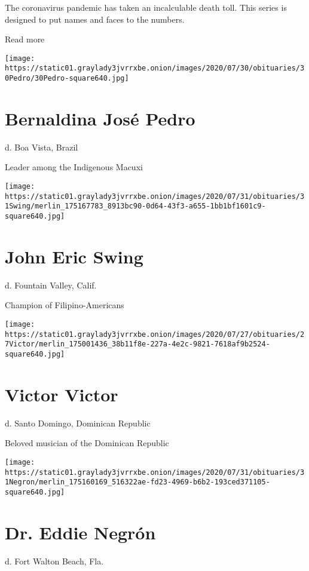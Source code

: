 The coronavirus pandemic has taken an incalculable death toll. This
series is designed to put names and faces to the numbers.

Read more

\texttt{[image: https://static01.graylady3jvrrxbe.onion/images/2020/07/30/obituaries/30Pedro/30Pedro-square640.jpg]}

\hypertarget{bernaldina-josuxe9-pedro}{%
\section{Bernaldina José Pedro}\label{bernaldina-josuxe9-pedro}}

d. Boa Vista, Brazil

Leader among the Indigenous Macuxi

\texttt{[image: https://static01.graylady3jvrrxbe.onion/images/2020/07/31/obituaries/31Swing/merlin\_175167783\_8913bc90-0d64-43f3-a655-1bb1bf1601c9-square640.jpg]}

\hypertarget{john-eric-swing}{%
\section{John Eric Swing}\label{john-eric-swing}}

d. Fountain Valley, Calif.

Champion of Filipino-Americans

\texttt{[image: https://static01.graylady3jvrrxbe.onion/images/2020/07/27/obituaries/27Victor/merlin\_175001436\_38b11f8e-227a-4e2c-9821-7618af9b2524-square640.jpg]}

\hypertarget{victor-victor}{%
\section{Victor Victor}\label{victor-victor}}

d. Santo Domingo, Dominican Republic

Beloved musician of the Dominican Republic

\texttt{[image: https://static01.graylady3jvrrxbe.onion/images/2020/07/31/obituaries/31Negron/merlin\_175160169\_516322ae-fd23-4969-b6b2-193ced371105-square640.jpg]}

\hypertarget{dr-eddie-negruxf3n}{%
\section{Dr. Eddie Negrón}\label{dr-eddie-negruxf3n}}

d. Fort Walton Beach, Fla.

